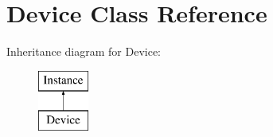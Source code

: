 \hypertarget{class_open_chams_1_1_device}{}\section{Device Class Reference}
\label{class_open_chams_1_1_device}
Inheritance diagram for Device\+:\begin{figure}[H]
\begin{center}
\leavevmode
\includegraphics[height=2.000000cm]{class_open_chams_1_1_device}
\end{center}
\end{figure}
